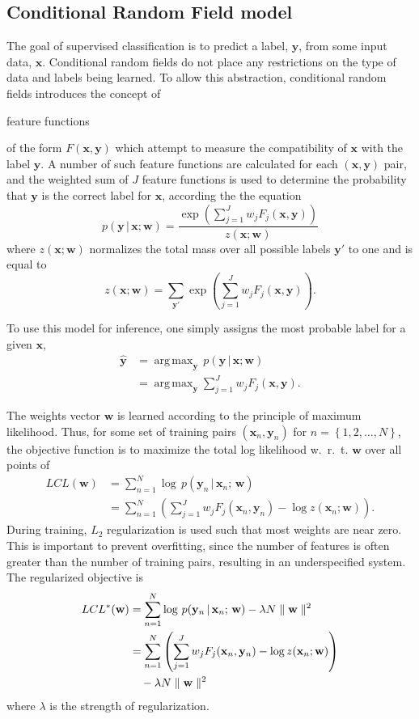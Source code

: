 \documentclass[10pt,twocolumn,letterpaper]{article}
\newcommand{\x}{\mathbf{x}}
\newcommand{\y}{\mathbf{y}}
\newcommand{\w}{\mathbf{w}}
\DeclareMathOperator*{\argmax}{arg\,max}
\begin{document}
\subsection{Conditional Random Field model}



The goal of supervised classification is to predict a label, $\y$, from some input data, $\x$. Conditional random fields do not place any restrictions on the type of data and labels being learned. To allow this abstraction, conditional random fields introduces the concept of \begin{em}feature functions\end{em} of the form $F(\x,\y)$ which attempt to measure the compatibility of $\x$ with the label $\y$. A number of such feature functions are calculated for each $(\x,\y)$ pair, and the weighted sum of $J$ feature functions is used to determine the probability that $\y$ is the correct label for $\x$, according the the equation
\begin{equation}
	p(\y\,|\,\x;\w) = \frac{\exp \left( \sum_{j=1}^J w_j F_j (\x,\y) \right)}{z(\x;\w)}
\end{equation}
where $z(\x;\w)$ normalizes the total mass over all possible labels $\y'$ to one and is equal to
\begin{equation}
	z(\x;\w) = \sum_{\y'} \exp \left( \sum_{j=1}^J w_j F_j (\x,\y) \right). \label{Eq:partition}
\end{equation}

To use this model for inference, one simply assigns the most probable label for a given $\x$,
\begin{align}
	\hat{\y} & =\argmax_{\y} \, p(\y\,|\,\x;\w) \\
		&= \argmax_{\y} \sum_{j=1}^J w_j F_j(\x,\y).
\end{align}


The weights vector $\w$ is learned according to the principle of maximum likelihood. Thus, for some set of training pairs $(\x_n,\y_n)$ for $n=\left\{1,2,\dots,N\right\}$, the objective function is to maximize the total log likelihood w.~r.~t. $\w$ over all points of
\begin{align}
	LCL(\w) &= \sum_{n=1}^N \log\,p(\y_n\,|\,\x_n ;\,\w) \\
		&= \sum_{n=1}^N \left( \sum_{j=1}^J w_j F_j (\x_n,\y_n) - \log z(\x_n;\w) \right).
\end{align}
During training, $L_2$ regularization is used such that most weights are near zero. This is important to prevent overfitting, since the number of features is often greater than the number of training pairs, resulting in an underspecified system. The regularized objective is
\begin{align}
	LCL^*(\w) &= \sum_{n=1}^N \log\,p(\y_n\,|\,\x_n ;\,\w) - \lambda N\parallel \w \parallel^2 \\
		&= \sum_{n=1}^N \left( \sum_{j=1}^J w_j F_j (\x_n,\y_n)  - \log z(\x_n;\w) \right) \notag \\
		&\hspace{1 em}  - \lambda N\parallel \w \parallel^2
		\label{Eq:rLCL}
\end{align}
where $\lambda$ is the strength of regularization.
\end{document}
